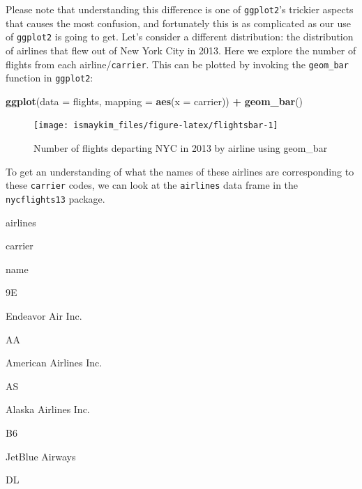 \documentclass[12pt,]{krantz}
\makeatletter
\newenvironment{Shaded}{\begin{snugshade}}{\end{snugshade}}
\newcommand{\KeywordTok}[1]{\textcolor[rgb]{0.27,0.27,0.27}{\textbf{#1}}}
\newcommand{\DataTypeTok}[1]{\textcolor[rgb]{0.27,0.27,0.27}{#1}}
\newcommand{\StringTok}[1]{\textcolor[rgb]{0.5,0.5,0.5}{#1}}
\newcommand{\OperatorTok}[1]{\textcolor[rgb]{0.43,0.43,0.43}{\textbf{#1}}}
\newcommand{\NormalTok}[1]{#1}
\newenvironment{kframe}{%
\medskip{}
\setlength{\fboxsep}{.8em}
 \def\at@end@of@kframe{}%
 \ifinner\ifhmode%
  \def\at@end@of@kframe{\end{minipage}}%
  \begin{minipage}{\columnwidth}%
 \fi\fi%
 \def\FrameCommand##1{\hskip\@totalleftmargin \hskip-\fboxsep
 \colorbox{shadecolor}{##1}\hskip-\fboxsep
     \hskip-\linewidth \hskip-\@totalleftmargin \hskip\columnwidth}%
 \MakeFramed {\advance\hsize-\width
   \@totalleftmargin\z@ \linewidth\hsize
   \@setminipage}}%
 {\par\unskip\endMakeFramed%
 \at@end@of@kframe}
\renewenvironment{Shaded}{\begin{kframe}}{\end{kframe}}
\makeatother
\begin{document}
Please note that understanding this difference is one of
\texttt{ggplot2}'s trickier aspects that causes the most confusion, and
fortunately this is as complicated as our use of \texttt{ggplot2} is
going to get. Let's consider a different distribution: the distribution
of airlines that flew out of New York City in 2013. Here we explore the
number of flights from each airline/\texttt{carrier}. This can be
plotted by invoking the \texttt{geom\_bar} function in \texttt{ggplot2}:




\begin{Shaded}
\begin{Highlighting}[]
\KeywordTok{ggplot}\NormalTok{(}\DataTypeTok{data =}\NormalTok{ flights, }\DataTypeTok{mapping =} \KeywordTok{aes}\NormalTok{(}\DataTypeTok{x =}\NormalTok{ carrier)) }\OperatorTok{+}
\StringTok{  }\KeywordTok{geom_bar}\NormalTok{()}
\end{Highlighting}
\end{Shaded}

\begin{figure}

{\centering \texttt{[image: ismaykim\_files/figure-latex/flightsbar-1]} 

}

\caption{Number of flights departing NYC in 2013 by airline using
geom\_bar}\label{fig:flightsbar}
\end{figure}

To get an understanding of what the names of these airlines are
corresponding to these \texttt{carrier} codes, we can look at the
\texttt{airlines} data frame in the \texttt{nycflights13} package.

\begin{Shaded}
\begin{Highlighting}[]
\NormalTok{airlines}
\end{Highlighting}
\end{Shaded}

carrier

name

9E

Endeavor Air Inc.

AA

American Airlines Inc.

AS

Alaska Airlines Inc.

B6

JetBlue Airways

DL
\end{document}
